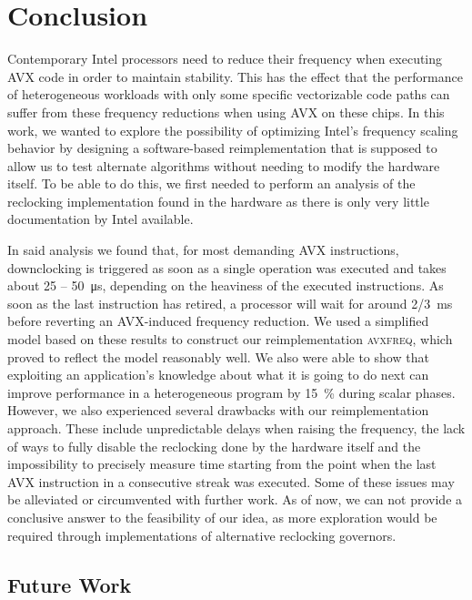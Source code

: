\chapter{Conclusion}
\label{sec:conclusion}

Contemporary Intel processors need to reduce their frequency when executing \gls{AVX} code in order to maintain stability. This has the effect that the performance of heterogeneous workloads with only some specific vectorizable code paths can suffer from these frequency reductions when using \gls{AVX} on these chips. In this work, we wanted to explore the possibility of optimizing Intel's frequency scaling behavior by designing a software-based reimplementation that is supposed to allow us to test alternate algorithms without needing to modify the hardware itself. To be able to do this, we first needed to perform an analysis of the reclocking implementation found in the hardware as there is only very little documentation by Intel available.

In said analysis we found that, for most demanding \gls{AVX} instructions, downclocking is triggered as soon as a single operation was executed and takes about 25 -- \SI{50}{\micro\second}, depending on the heaviness of the executed instructions. As soon as the last instruction has retired, a processor will wait for around \SI[quotient-mode=fraction]{2/3}{\milli\second} before reverting an \gls{AVX}-induced frequency reduction. We used a simplified model based on these results to construct our reimplementation \textsc{avxfreq}, which proved to reflect the model reasonably well. We also were able to show that exploiting an application's knowledge about what it is going to do next can improve performance in a heterogeneous program by \SI{15}{\percent} during scalar phases. However, we also experienced several drawbacks with our reimplementation approach. These include unpredictable delays when raising the frequency, the lack of ways to fully disable the reclocking done by the hardware itself and the impossibility to precisely measure time starting from the point when the last \gls{AVX} instruction in a consecutive streak was executed. Some of these issues may be alleviated or circumvented with further work. As of now, we can not provide a conclusive answer to the feasibility of our idea, as more exploration would be required through implementations of alternative reclocking governors.

\section{Future Work}
\label{sec:conclusion:futurework}

